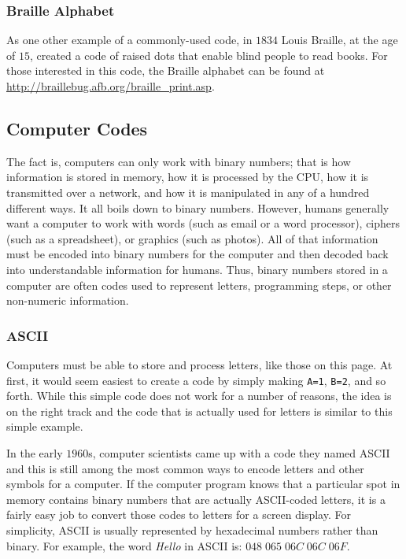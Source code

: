 \subsubsection{Braille Alphabet}
\label{MO:subsub:braille_alphabet}

As one other example of a commonly-used code, in $ 1834 $ Louis Braille, at the age of $ 15 $, created a code of raised dots that enable blind people to read books. For those interested in this code, the Braille alphabet can be found at \url{http://braillebug.afb.org/braille_print.asp}. 

\subsection{Computer Codes}
\label{MO:sub:computer_codes}

The fact is, computers can only work with binary numbers; that is how information is stored in memory, how it is processed by the \ac{CPU}, how it is transmitted over a network, and how it is manipulated in any of a hundred different ways. It all boils down to binary numbers. However, humans generally want a computer to work with words (such as email or a word processor), ciphers (such as a spreadsheet), or graphics (such as photos). All of that information must be encoded into binary numbers for the computer and then decoded back into understandable information for humans. Thus, binary numbers stored in a computer are often codes used to represent letters, programming steps, or other non-numeric information. 

\subsubsection{ASCII}
\label{MO:subsub:ascii}

Computers must be able to store and process letters, like those on this page. At first, it would seem easiest to create a code by simply making \lstinline[columns=fixed]|A=1|, \lstinline[columns=fixed]|B=2|, and so forth. While this simple code does not work for a number of reasons, the idea is on the right track and the code that is actually used for letters is similar to this simple example. 

In the early $ 1960 $s, computer scientists came up with a code they named \ac{ASCII} and this is still among the most common ways to encode letters and other symbols for a computer. If the computer program knows that a particular spot in memory contains binary numbers that are actually ASCII-coded letters, it is a fairly easy job to convert those codes to letters for a screen display. For simplicity, \ac{ASCII} is usually represented by hexadecimal numbers rather than binary. For example, the word \emph{Hello} in \ac{ASCII} is: $ 048 \; 065 \; 06C \; 06C \; 06F $.

